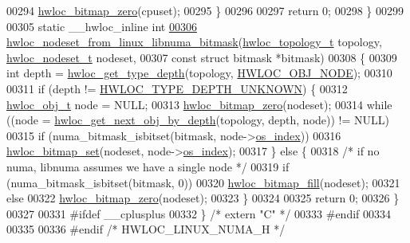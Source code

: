 \begin{DoxyCode}
00294       \hyperlink{a00065_ga6c540b9fe63b8223b6aba46d56dd63b8}{hwloc_bitmap_zero}(cpuset);
00295   \}
00296 
00297   \textcolor{keywordflow}{return} 0;
00298 \}
00299 
00305 \textcolor{keyword}{static} \_\_hwloc\_inline \textcolor{keywordtype}{int}
\hypertarget{a00034_source_l00306}{}\hyperlink{a00069_ga5a1d17375cc7b65cd155330008cbdb6a}{00306} \hyperlink{a00069_ga5a1d17375cc7b65cd155330008cbdb6a}{hwloc_nodeset_from_linux_libnuma_bitmask}(\hyperlink{a00039_ga9d1e76ee15a7dee158b786c30b6a6e38}{hwloc_topology_t} topology, 
      \hyperlink{a00040_ga37e35730fa7e775b5bb0afe893d6d508}{hwloc_nodeset_t} nodeset,
00307                                          \textcolor{keyword}{const} \textcolor{keyword}{struct} bitmask *bitmask)
00308 \{
00309   \textcolor{keywordtype}{int} depth = \hyperlink{a00046_gaea7c64dd59467f5201ba87712710b14d}{hwloc_get_type_depth}(topology, \hyperlink{a00041_ggacd37bb612667dc437d66bfb175a8dc55aaf0964881117bdedf1a5e9332cd120dd}{HWLOC_OBJ_NODE});
00310 
00311   \textcolor{keywordflow}{if} (depth != \hyperlink{a00046_ggaf4e663cf42bbe20756b849c6293ef575a0565ab92ab72cb0cec91e23003294aad}{HWLOC_TYPE_DEPTH_UNKNOWN}) \{
00312     \hyperlink{a00016}{hwloc_obj_t} node = NULL;
00313     \hyperlink{a00065_ga6c540b9fe63b8223b6aba46d56dd63b8}{hwloc_bitmap_zero}(nodeset);
00314     \textcolor{keywordflow}{while} ((node = \hyperlink{a00053_gab7c1dce3f42ece5bfa621e87cf332418}{hwloc_get_next_obj_by_depth}(topology, depth, node)) != NULL)
00315       \textcolor{keywordflow}{if} (numa\_bitmask\_isbitset(bitmask, node->\hyperlink{a00016_a61a7a80a68eaccbaaa28269e678c81a9}{os_index}))
00316         \hyperlink{a00065_ga497556af0cc34f109ae0277999c074d3}{hwloc_bitmap_set}(nodeset, node->\hyperlink{a00016_a61a7a80a68eaccbaaa28269e678c81a9}{os_index});
00317   \} \textcolor{keywordflow}{else} \{
00318     \textcolor{comment}{/* if no numa, libnuma assumes we have a single node */}
00319     \textcolor{keywordflow}{if} (numa\_bitmask\_isbitset(bitmask, 0))
00320       \hyperlink{a00065_ga52456f7ef79d68e610cb65e3f7ffafad}{hwloc_bitmap_fill}(nodeset);
00321     \textcolor{keywordflow}{else}
00322       \hyperlink{a00065_ga6c540b9fe63b8223b6aba46d56dd63b8}{hwloc_bitmap_zero}(nodeset);
00323   \}
00324 
00325   \textcolor{keywordflow}{return} 0;
00326 \}
00327 
00331 \textcolor{preprocessor}{#ifdef \_\_cplusplus}
00332 \textcolor{preprocessor}{}\} \textcolor{comment}{/* extern "C" */}
00333 \textcolor{preprocessor}{#endif}
00334 \textcolor{preprocessor}{}
00335 
00336 \textcolor{preprocessor}{#endif }\textcolor{comment}{/* HWLOC\_LINUX\_NUMA\_H */}
\end{DoxyCode}
